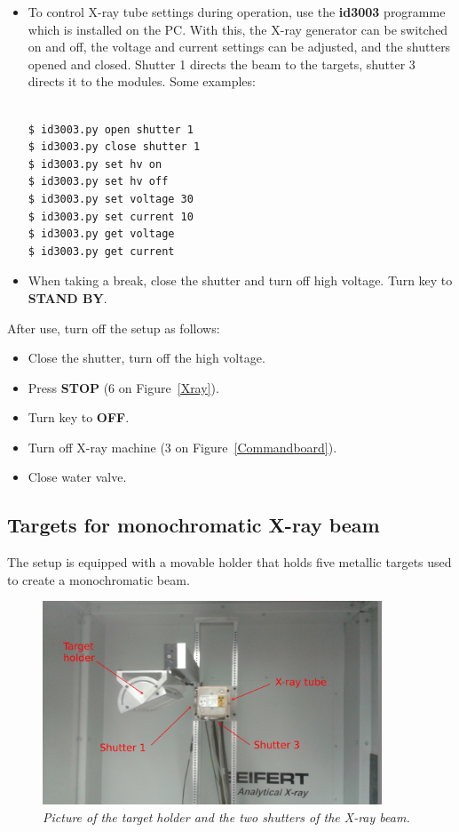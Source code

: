 \documentclass[a4paper,12pt,twoside]{article}
\begin{document}
\begin{itemize}
\item {To control X-ray tube settings during operation, use the \textbf{id3003} programme which is installed on the PC. With this, the X-ray generator can be switched on and off, the voltage and current settings can be adjusted, and the shutters opened and closed. Shutter 1 directs the beam to the targets, shutter 3 directs it to the modules. Some examples:
\\
\\
\begin{Verbatim}[frame=single]
$ id3003.py open shutter 1
$ id3003.py close shutter 1
$ id3003.py set hv on
$ id3003.py set hv off
$ id3003.py set voltage 30
$ id3003.py set current 10
$ id3003.py get voltage
$ id3003.py get current
\end{Verbatim}
}
\item{When taking a break, close the shutter and turn off high voltage. Turn key to \textbf{STAND BY}.}
\end{itemize}
After use, turn off the setup as follows:
\begin{itemize}
\item {Close the shutter, turn off the high voltage.}
\item {Press \textbf{STOP} (6 on Figure~\ref{Xray}).}
\item {Turn key to \textbf{OFF}.}
\item {Turn off X-ray machine (3 on Figure~\ref{Commandboard}).}
\item {Close water valve.}
\end{itemize}

\subsection{Targets for monochromatic X-ray beam}

The setup is equipped with a movable holder that holds five metallic targets used to create a monochromatic beam. 

\begin{figure} [h!] \centering 
\includegraphics[width=0.9\textwidth, angle=0] {./Figures/Targets.jpg}
\caption{\em  \label{Targets}
Picture of the target holder and the two shutters of the X-ray beam.}
\end{figure}
\end{document}
